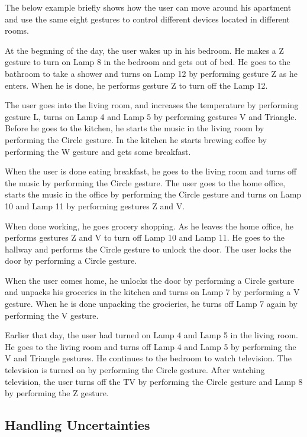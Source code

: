 The below example briefly shows how the user can move around his apartment and use the same eight gestures to control different devices located in different rooms.

\begin{testexample}
At the begnning of the day, the user wakes up in his bedroom. He makes a Z gesture to turn on Lamp 8 in the bedroom and gets out of bed. He goes to the bathroom to take a shower and turns on Lamp 12 by performing gesture Z as he enters. When he is done, he performs gesture Z to turn off the Lamp 12.

The user goes into the living room, and increases the temperature by performing gesture L, turns on Lamp 4 and Lamp 5 by performing gestures V and Triangle. Before he goes to the kitchen, he starts the music in the living room by performing the Circle gesture. In the kitchen he starts brewing coffee by performing the W gesture and gets some breakfast.

When the user is done eating breakfast, he goes to the living room and turns off the music by performing the Circle gesture. The user goes to the home office, starts the music in the office by performing the Circle gesture and turns on Lamp 10 and Lamp 11 by performing gestures Z and V.

When done working, he goes grocery shopping. As he leaves the home office, he performs gestures Z and V to turn off Lamp 10 and Lamp 11. He goes to the hallway and performs the Circle gesture to unlock the door. The user locks the door by performing a Circle gesture.

When the user comes home, he unlocks the door by performing a Circle gesture and unpacks his groceries in the kitchen and turns on Lamp 7 by performing a V gesture. When he is done unpacking the grocieries, he turns off Lamp 7 again by performing the V gesture.

Earlier that day, the user had turned on Lamp 4 and Lamp 5 in the living room. He goes to the living room and turns off Lamp 4 and Lamp 5 by performing the V and Triangle gestures. He continues to the bedroom to watch television. The television is turned on by performing the Circle gesture. After watching television, the user turns off the TV by performing the Circle gesture and Lamp 8 by performing the Z gesture.
\end{testexample}

\subsection{Handling Uncertainties}
\label{sec:analysis:scenarios:handling_uncertainties}

